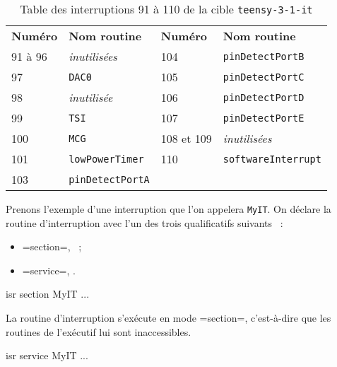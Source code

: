 \begin{table}[!t]
  \small
  \centering
  \begin{tabular}{ll|ll}
    \textbf{Numéro}& \textbf{Nom routine} & \textbf{Numéro}& \textbf{Nom routine} \\
    91 à 96  & \emph{inutilisées} &     104  & \texttt{pinDetectPortB}\\
    97  & \texttt{DAC0}  & 105  & \texttt{pinDetectPortC} \\
    98  & \emph{inutilisée} & 106  & \texttt{pinDetectPortD}\\
    99  & \texttt{TSI} & 107  & \texttt{pinDetectPortE}\\
    100  & \texttt{MCG} & 108 et 109  & \emph{inutilisées}\\
    101  & \texttt{lowPowerTimer} & 110  & \texttt{softwareInterrupt}\\
    103  & \texttt{pinDetectPortA} & &\\
  \end{tabular}
  \caption{Table des interruptions 91 à 110 de la cible \texttt{teensy-3-1-it}}
  \ligne
\end{table}



Prenons l'exemple d'une interruption que l'on appelera \texttt{MyIT}. On déclare la routine d'interruption avec l'un des trois qualificatifs suivants ~:
\begin{itemize}
  \item \omnibus=section=, ~;
  \item \omnibus=service=, .
\end{itemize}




\begin{OMNIBUS}
isr section MyIT {
  ...
}
\end{OMNIBUS}

La routine d'interruption s'exécute en mode \omnibus=section=, c'est-à-dire que les routines de l'exécutif lui sont inaccessibles.




\begin{OMNIBUS}
isr service MyIT {
  ...
}
\end{OMNIBUS}

